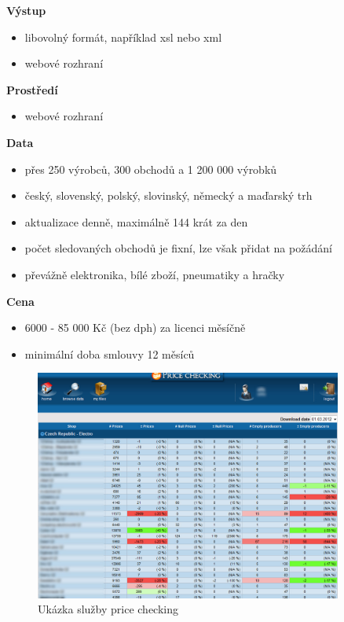 \documentclass[thesis=B,czech]{FITthesis}[2012/06/26]
\begin{document}
\textbf{Výstup}
\begin{itemize}
\item libovolný formát, například xsl nebo xml
\item webové rozhraní
\end{itemize}

\textbf{Prostředí}
\begin{itemize}
\item webové rozhraní
\end{itemize}

\textbf{Data}
\begin{itemize}
\item přes 250 výrobců, 300 obchodů a 1 200 000 výrobků
\item český, slovenský, polský, slovinský, německý a maďarský trh
\item aktualizace denně, maximálně 144 krát za den
\item počet sledovaných obchodů je fixní, lze však přidat na požádání
\item převážně elektronika, bílé zboží, pneumatiky a hračky
\end{itemize}

\textbf{Cena}
\begin{itemize}
\item 6000 - 85 000 Kč (bez dph) za licenci měsíčně
\item minimální doba smlouvy 12 měsíců
\end{itemize}

\begin{figure}[h]\centering
 	\includegraphics[width=0.9\textwidth]{resources/priceChecking}
	\caption[Price checking]{Ukázka služby price checking}\label{fig:priceChecking}
\end{figure}
\end{document}
